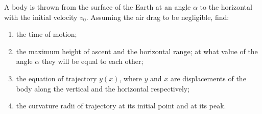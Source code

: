 
\item A body is thrown from the surface of the Earth at an angle $\alpha$ to the horizontal with the initial velocity $v_0$. Assuming the air drag to be negligible, find:
    \begin{enumerate}
        \item the time of motion;
        \item the maximum height of ascent and the horizontal range; at what value of the angle $\alpha$ they will be equal to each other;
        \item the equation of trajectory $y(x)$, where $y$ and $x$ are displacements of the body along the vertical and the horizontal respectively;
        \item the curvature radii of trajectory at its initial point and at its peak.
    \end{enumerate}
